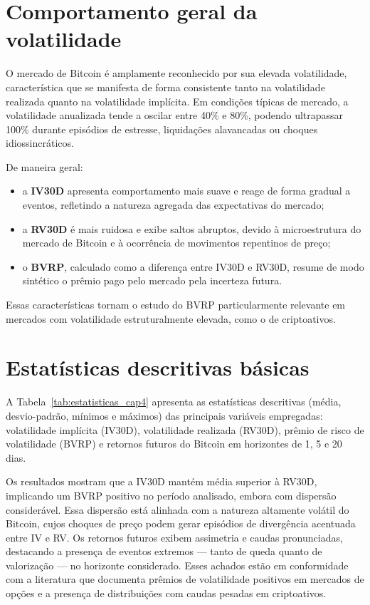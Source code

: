 \section{Comportamento geral da volatilidade}

O mercado de Bitcoin é amplamente reconhecido por sua elevada volatilidade,
característica que se manifesta de forma consistente tanto na volatilidade
realizada quanto na volatilidade implícita. Em condições típicas de mercado, a
volatilidade anualizada tende a oscilar entre 40\% e 80\%, podendo ultrapassar
100\% durante episódios de estresse, liquidações alavancadas ou choques
idiossincráticos.

De maneira geral:

\begin{itemize}
    \item a \textbf{IV30D} apresenta comportamento mais suave e reage de forma gradual
          a eventos, refletindo a natureza agregada das expectativas do mercado;
    \item a \textbf{RV30D} é mais ruidosa e exibe saltos abruptos, devido à
          microestrutura do mercado de Bitcoin e à ocorrência de movimentos
          repentinos de preço;
    \item o \textbf{BVRP}, calculado como a diferença entre IV30D e RV30D,
          resume de modo sintético o prêmio pago pelo mercado pela incerteza
          futura.
\end{itemize}

Essas características tornam o estudo do BVRP particularmente relevante em
mercados com volatilidade estruturalmente elevada, como o de criptoativos.

\section{Estatísticas descritivas básicas}
\label{sec:estatisticas_basicas}

A Tabela~\ref{tab:estatisticas_cap4} apresenta as estatísticas descritivas
(média, desvio-padrão, mínimos e máximos) das principais variáveis empregadas:
volatilidade implícita (IV30D), volatilidade realizada (RV30D), prêmio de risco
de volatilidade (BVRP) e retornos futuros do Bitcoin em horizontes de 1, 5 e
20 dias.



Os resultados mostram que a IV30D mantém média superior à RV30D, implicando um
BVRP positivo no período analisado, embora com dispersão considerável. Essa
dispersão está alinhada com a natureza altamente volátil do Bitcoin, cujos
choques de preço podem gerar episódios de divergência acentuada entre IV e RV.
Os retornos futuros exibem assimetria e caudas pronunciadas, destacando a
presença de eventos extremos — tanto de queda quanto de valorização — no
horizonte considerado. Esses achados estão em conformidade com a literatura que
documenta prêmios de volatilidade positivos em mercados de opções e a presença
de distribuições com caudas pesadas em criptoativos.

